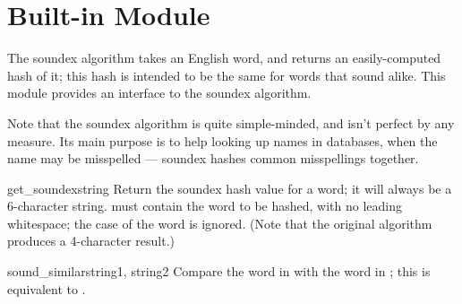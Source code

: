 \section{Built-in Module }




The soundex algorithm takes an English word, and returns an
easily-computed hash of it; this hash is intended to be the same for
words that sound alike.  This module provides an interface to the
soundex algorithm.

Note that the soundex algorithm is quite simple-minded, and isn't
perfect by any measure.  Its main purpose is to help looking up names
in databases, when the name may be misspelled --- soundex hashes common
misspellings together.

\begin{funcdesc}{get_soundex}{string}
Return the soundex hash value for a word; it will always be a
6-character string.   must contain the word to be hashed,
with no leading whitespace; the case of the word is ignored.  (Note
that the original algorithm produces a 4-character result.)
\end{funcdesc}

\begin{funcdesc}{sound_similar}{string1, string2}
Compare the word in  with the word in ; this
is equivalent to 
 \code{==}
.
\end{funcdesc}


\begin{seealso}


\end{seealso}
